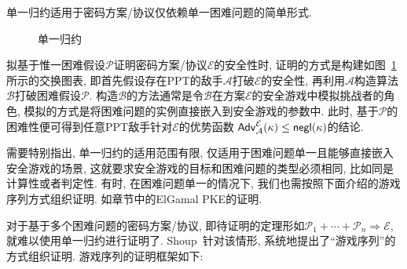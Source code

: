 单一归约适用于密码方案/协议仅依赖单一困难问题的简单形式. 
\begin{figure}[!hbtp]
\begin{center}
\end{center}
\caption{单一归约}\label{figure:solo-reduction}
\end{figure}
拟基于惟一困难假设$\mathcal{P}$证明密码方案/协议$\mathcal{E}$的安全性时, 
证明的方式是构建如图~\ref{figure:solo-reduction}所示的交换图表, 
即首先假设存在PPT的敌手$\mathcal{A}$打破$\mathcal{E}$的安全性, 
再利用$\mathcal{A}$构造算法$\mathcal{B}$打破困难假设$\mathcal{P}$. 
构造$\mathcal{B}$的方法通常是令$\mathcal{B}$在方案$\mathcal{E}$的安全游戏中模拟挑战者的角色, 
模拟的方式是将困难问题的实例直接嵌入到安全游戏的参数中. 
此时, 基于$\mathcal{P}$的困难性便可得到任意PPT敌手针对$\mathcal{E}$的优势函数
$\mathsf{Adv}_\mathcal{A}^\mathcal{E}(\kappa) \leq \mathsf{negl}(\kappa)$的结论.  

\begin{remark}
需要特别指出, 单一归约的适用范围有限, 仅适用于困难问题单一且能够直接嵌入安全游戏的场景, 
这就要求安全游戏的目标和困难问题的类型必须相同, 比如同是计算性或者判定性. 
有时, 在困难问题单一的情况下, 我们也需按照下面介绍的游戏序列方式组织证明. 如章节中的ElGamal PKE的证明. 
\end{remark}
 
对于基于多个困难问题的密码方案/协议, 即待证明的定理形如$\mathcal{P}_1+\cdots+\mathcal{P}_n \Rightarrow \mathcal{E}$, 
就难以使用单一归约进行证明了.  
Shoup~\cite{Shoup-ePrint-2004}针对该情形, 系统地提出了``游戏序列''的方式组织证明. 游戏序列的证明框架如下: 

